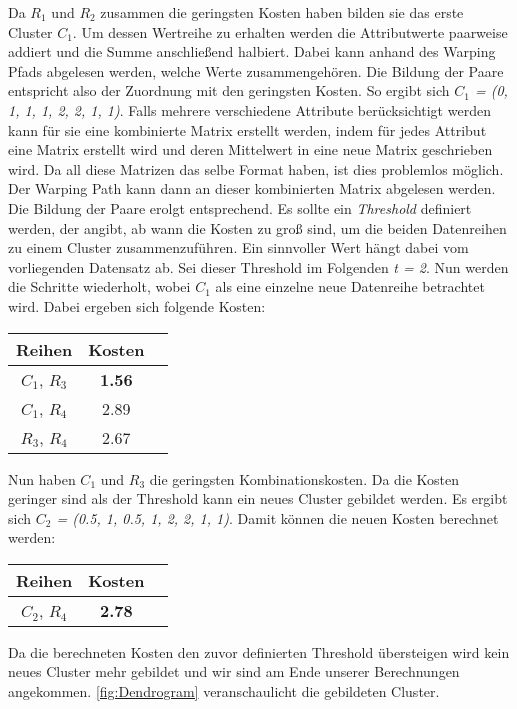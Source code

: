 Da \emph{$R_{1}$} und \emph{$R_{2}$} zusammen die geringsten Kosten haben bilden sie das erste Cluster \emph{$C_{1}$}.
Um dessen Wertreihe zu erhalten werden die Attributwerte paarweise addiert und die Summe anschließend halbiert.
Dabei kann anhand des Warping Pfads abgelesen werden, welche Werte zusammengehören.
Die Bildung der Paare entspricht also der Zuordnung mit den geringsten Kosten.
So ergibt sich \emph{$C_{1}$ = (0, 1, 1, 1, 2, 2, 1, 1)}.
Falls mehrere verschiedene Attribute berücksichtigt werden kann für sie eine kombinierte Matrix erstellt werden,
indem für jedes Attribut eine Matrix erstellt wird und deren Mittelwert in eine neue Matrix geschrieben wird.
Da all diese Matrizen das selbe Format haben, ist dies problemlos möglich.
Der Warping Path kann dann an dieser kombinierten Matrix abgelesen werden.
Die Bildung der Paare erolgt entsprechend.
Es sollte ein \emph{Threshold} definiert werden,
der angibt, ab wann die Kosten zu groß sind, um die beiden Datenreihen zu einem Cluster zusammenzuführen.
Ein sinnvoller Wert hängt dabei vom vorliegenden Datensatz ab.
Sei dieser Threshold im Folgenden \emph{t = 2}.
Nun werden die Schritte wiederholt, wobei \emph{$C_{1}$} als eine einzelne neue Datenreihe betrachtet wird.
Dabei ergeben sich folgende Kosten:
\begin{center}
    \begin{tabular}{ |c|c|c| } 
     \hline
     Reihen & Kosten \\
     \hline \hline
     $C_{1}$, $R_{3}$ & \textbf{1.56} \\
     \hline
     $C_{1}$, $R_{4}$ & 2.89 \\
     \hline
     $R_{3}$, $R_{4}$ & 2.67 \\
     \hline
    \end{tabular}
\end{center}
Nun haben \emph{$C_{1}$} und \emph{$R_{3}$} die geringsten Kombinationskosten.
Da die Kosten geringer sind als der Threshold kann ein neues Cluster gebildet werden.
Es ergibt sich \emph{$C_{2}$ = (0.5, 1, 0.5, 1, 2, 2, 1, 1)}.
Damit können die neuen Kosten berechnet werden:
\begin{center}
    \begin{tabular}{ |c|c|c| } 
     \hline
     Reihen & Kosten \\
     \hline \hline
     $C_{2}$, $R_{4}$ & \textbf{2.78} \\
     \hline
    \end{tabular}
\end{center}
Da die berechneten Kosten den zuvor definierten Threshold übersteigen wird kein neues Cluster mehr gebildet
und wir sind am Ende unserer Berechnungen angekommen.
\autoref{fig:Dendrogram} veranschaulicht die gebildeten Cluster.


